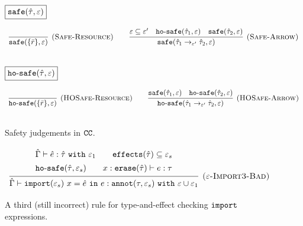 \begin{figure}

\noindent
$\fbox{$\mathtt{safe}(\hat \tau, \varepsilon)$}$

\[
\begin{array}{c}

\infer[\textsc{(Safe-Resource)}]
	{ \kwa{safe}(\{ \bar r \}, \varepsilon) }
	{} 
\hspace{5ex}
	
\infer[\textsc{(Safe-Arrow)}]
	{\kwa{safe}(\hat \tau_1 \rightarrow_{\varepsilon'} \hat \tau_2, \varepsilon)}
	{\varepsilon \subseteq \varepsilon' & \kwa{ho \hyphen safe}(\hat \tau_1, \varepsilon) & \kwa{safe}(\hat \tau_2, \varepsilon)} \\[3ex]

\end{array}
\]

\noindent
$\fbox{$\mathtt{ho \hbox{-} safe}(\hat \tau, \varepsilon)$}$

\[
\begin{array}{c}

\infer[\textsc{(HOSafe-Resource)}]
	{ \kwa{ho \hyphen safe}( \{ \bar r \}, \varepsilon)} 
	{}
\hspace{5ex}

\infer[\textsc{(HOSafe-Arrow)}]
	{ \kwa{ho \hyphen safe}( \hat \tau_1 \rightarrow_{\varepsilon'} \hat \tau_2, \varepsilon ) }
	{ \kwa{safe}(\hat \tau_1, \varepsilon)  & \kwa{ho \hyphen safe}(\hat \tau_2, \varepsilon) }\\[3ex]

\end{array}
\]

\vspace{-0.5cm}
\caption{Safety judgements in $\mathtt{CC}$.}
\vspace{-0.5cm}
\label{fig:safe_defns}
\end{figure}

\begin{figure}
\vspace{-0.5cm}

\[
\begin{array}{c}

\infer[\textsc{($\varepsilon$-Import3-Bad)}]
	{ \hat \Gamma \vdash \kwa{import}(\varepsilon_s)~x = \hat e~\kw{in} e: \kwa{annot}(\tau, \varepsilon_s)~\kw{with} \varepsilon \cup \varepsilon_1 }
{{\def\arraystretch{1.4}
  \begin{array}{c}
\hat \Gamma \vdash \hat e: \hat \tau~\kw{with} \varepsilon_1
~~~~~~
\kwa{effects}(\hat \tau) \subseteq \varepsilon_s \\
\hosafe{\hat \tau}{\varepsilon_s} ~~~~~~ x: \kwa{erase}(\hat \tau) \vdash e: \tau
  \end{array}}} 
 
\end{array}
\]

\vspace{-0.2cm}
\caption{A third (still incorrect) rule for type-and-effect checking $\mathtt{import}$ expressions.}
\vspace{-0.8cm}
\label{fig:import_rule3}
\end{figure}


